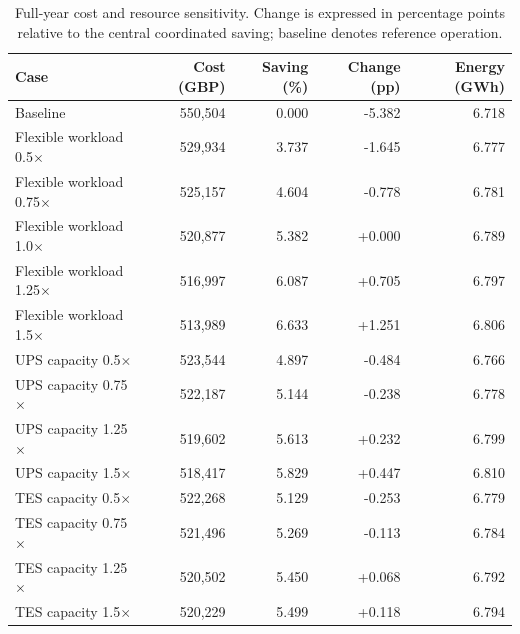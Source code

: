\begin{table}[htbp]
\centering\small
\caption{Full-year cost and resource sensitivity. \textcolor{LatestGreen}{Change is expressed in percentage points relative to} the central coordinated saving; baseline denotes reference operation.}\label{tab:annual-endpoints}
\begin{tabular}{@{}lrrrr@{}}\toprule
Case & Cost (GBP) & Saving (\%) & Change (pp) & Energy (GWh) \\\midrule
Baseline & 550,504 & 0.000 & -5.382 & 6.718 \\
Flexible workload 0.5$\times$ & 529,934 & 3.737 & -1.645 & 6.777 \\
Flexible workload 0.75$\times$ & 525,157 & 4.604 & -0.778 & 6.781 \\
Flexible workload 1.0$\times$ & 520,877 & 5.382 & +0.000 & 6.789 \\
Flexible workload 1.25$\times$ & 516,997 & 6.087 & +0.705 & 6.797 \\
Flexible workload 1.5$\times$ & 513,989 & 6.633 & +1.251 & 6.806 \\
UPS capacity 0.5$\times$ & 523,544 & 4.897 & -0.484 & 6.766 \\
UPS capacity 0.75$\times$ & 522,187 & 5.144 & -0.238 & 6.778 \\
UPS capacity 1.25$\times$ & 519,602 & 5.613 & +0.232 & 6.799 \\
UPS capacity 1.5$\times$ & 518,417 & 5.829 & +0.447 & 6.810 \\
TES capacity 0.5$\times$ & 522,268 & 5.129 & -0.253 & 6.779 \\
TES capacity 0.75$\times$ & 521,496 & 5.269 & -0.113 & 6.784 \\
TES capacity 1.25$\times$ & 520,502 & 5.450 & +0.068 & 6.792 \\
TES capacity 1.5$\times$ & 520,229 & 5.499 & +0.118 & 6.794 \\
\bottomrule\end{tabular}
\end{table}
